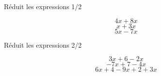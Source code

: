 \begin{frame}{Réduit les expressions 1/2}
    \begin{multicols}{3}
        \noindent$$4x+8x$$
        $$x+3x$$
        $$5x-7x$$
    \end{multicols}
\end{frame}

\begin{frame}{Réduit les expressions 2/2}
    \begin{multicols}{3}
        \noindent$$3x+6-2x$$
        $$-7x+7-4x$$
        $$6x+4-9x+2+3x$$
    \end{multicols}
\end{frame}